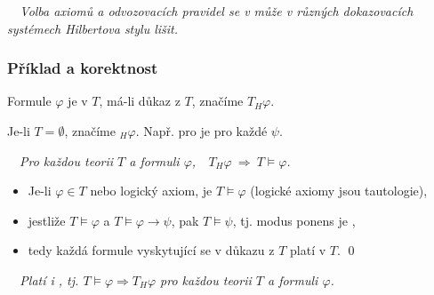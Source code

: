     \medskip
    
    {\it {}\ \ Volba axiomů a odvozovacích pravidel se v může v různých dokazovacích systémech Hilbertova stylu lišit.}
    
    \subsubsection*{Příklad a korektnost}
    Formule $\varphi$ je  v $T$, má-li důkaz z $T$, značíme $T _{H} \varphi$.
    \smallskip
    
    Je-li $T=\emptyset$, značíme $_H \varphi$. Např. pro  je  pro každé $\psi$.
    
    \vspace{-4mm}
    {\bf {}}\ \ {\it  Pro každou teorii $T$ a formuli $\varphi$,\ \ $T_H \varphi\ \Rightarrow\ T\models \varphi$.}
    \smallskip
    
    {\it {}}
    \begin{itemize}
    \item Je-li $\varphi\in T$ nebo logický axiom, je $T \models \varphi$ (logické axiomy jsou tautologie),
    \item jestliže $T \models \varphi$ a $T \models \varphi \to \psi$, pak $T \models \psi$, tj. modus ponens je ,
    \item tedy každá formule vyskytující se v důkazu z $T$ platí v $T$. \qed
\end{itemize}
    \medskip
    
    {\it {}\ \ Platí i , tj. $T\models \varphi \Rightarrow T_H \varphi$ pro každou teorii $T$ a formuli $\varphi$.}

